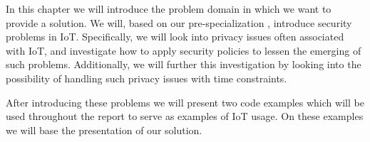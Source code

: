 In this chapter we will introduce the problem domain in which we want to provide a solution.
We will, based on our pre-specialization \cite{prespecialization}, introduce security problems in IoT.
Specifically, we will look into privacy issues often associated with IoT, and investigate how to apply security policies to lessen the emerging of such problems.
Additionally, we will further this investigation by looking into the possibility of handling such privacy issues with time constraints.

After introducing these problems we will present two code examples which will be used throughout the report to serve as examples of IoT usage.
On these examples we will base the presentation of our solution.
